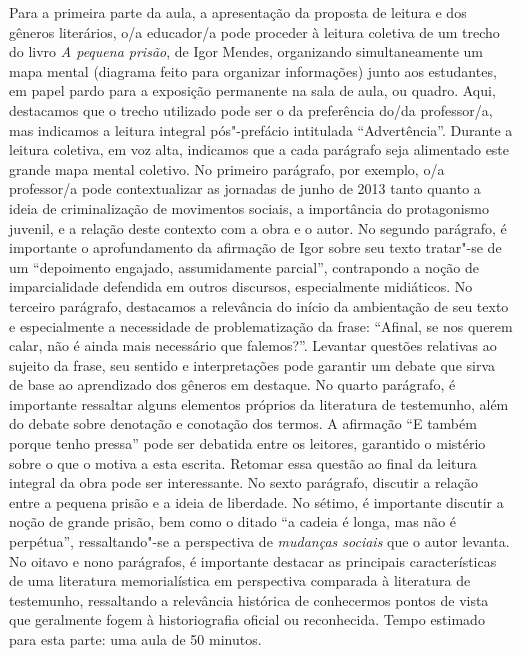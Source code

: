\documentclass[11pt]{extarticle}
\begin{document}
Para a primeira parte da aula, a apresentação da proposta de leitura e
dos gêneros literários, o/a educador/a pode proceder à leitura coletiva
de um trecho do livro \emph{A pequena prisão}, de Igor Mendes,
organizando simultaneamente um mapa mental (diagrama feito para
organizar informações) junto aos estudantes, em papel pardo para a
exposição permanente na sala de aula, ou quadro. Aqui, destacamos que o
trecho utilizado pode ser o da preferência do/da professor/a, mas
indicamos a leitura integral pós"-prefácio intitulada ``Advertência''.
Durante a leitura coletiva, em voz alta, indicamos que a cada parágrafo
seja alimentado este grande mapa mental coletivo. No primeiro parágrafo,
por exemplo, o/a professor/a pode contextualizar as jornadas de junho de
2013 tanto quanto a ideia de criminalização de movimentos sociais, a
importância do protagonismo juvenil, e a relação deste contexto com a
obra e o autor. No segundo parágrafo, é importante o aprofundamento da
afirmação de Igor sobre seu texto tratar"-se de um ``depoimento engajado,
assumidamente parcial'', contrapondo a noção de imparcialidade defendida
em outros discursos, especialmente midiáticos. No terceiro parágrafo,
destacamos a relevância do início da ambientação de seu texto e
especialmente a necessidade de problematização da frase: ``Afinal, se
nos querem calar, não é ainda mais necessário que falemos?''. Levantar
questões relativas ao sujeito da frase, seu sentido e interpretações
pode garantir um debate que sirva de base ao aprendizado dos gêneros em
destaque. No quarto parágrafo, é importante ressaltar alguns elementos
próprios da literatura de testemunho, além do debate sobre denotação e
conotação dos termos. A afirmação ``E também porque tenho pressa'' pode
ser debatida entre os leitores, garantido o mistério sobre o que o
motiva a esta escrita. Retomar essa questão ao final da leitura integral
da obra pode ser interessante. No sexto parágrafo, discutir a relação
entre a pequena prisão e a ideia de liberdade. No sétimo, é importante
discutir a noção de grande prisão, bem como o ditado ``a cadeia é longa,
mas não é perpétua'', ressaltando"-se a perspectiva de \emph{mudanças
sociais} que o autor levanta. No oitavo e nono parágrafos, é importante
destacar as principais características de uma literatura memorialística
em perspectiva comparada à literatura de testemunho, ressaltando a
relevância histórica de conhecermos pontos de vista que geralmente fogem
à historiografia oficial ou reconhecida. Tempo estimado para esta parte:
uma aula de 50 minutos.

\end{document}
